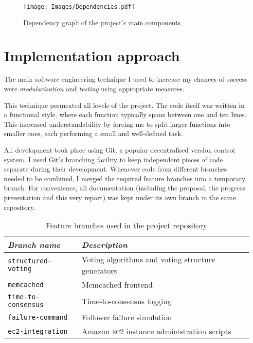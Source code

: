 \documentclass[11pt,chapterprefix=true,toc=bibliography,numbers=noendperiod,
               footnotes=multiple,twoside]{scrreprt}
\newcommand{\ECC}[0]{\textsc{ec}2 }
\begin{document}
\begin{figure}[h]
    \centering
    \texttt{[image: Images/Dependencies.pdf]}
    \caption{Dependency graph of the project's main components}
    \label{fig:dependencies}
\end{figure}

\section{Implementation approach\label{sc:implementation-strategy}}

The main software engineering technique I used to increase my chances of success were \emph{modularisation} and \emph{testing} using appropriate measures.


This technique permeated all levels of the project. The code itself was written in a functional style, where each function typically spans between one and ten lines. This increased understandability by forcing me to split larger functions into smaller ones, each performing a small and well-defined task.

All development took place using Git, a popular decentralised version control system. I used Git's branching facility to keep independent pieces of code separate during their development. Whenever code from different branches needed to be combined, I merged the required feature branches into a temporary branch. For convenience, all documentation (including the proposal, the progress presentation and this very report) was kept under its own branch in the same repository.

\begin{table}[h]
    \centering
    \begin{tabularx}{\textwidth}{l X}
        \toprule
        \textit{Branch name} & \textit{Description} \\
        \midrule
        \texttt{structured-voting} & Voting algorithms and voting structure generators \\
        \texttt{memcached} & Memcached frontend \\
        \texttt{time-to-consensus} & Time-to-consensus logging \\
        \texttt{failure-command} & Follower failure simulation \\
        \texttt{ec2-integration} & Amazon \ECC instance administration scripts \\
        \bottomrule
    \end{tabularx}
    \caption{Feature branches used in the project repository}
    \label{tab:branches}
\end{table}
\end{document}
